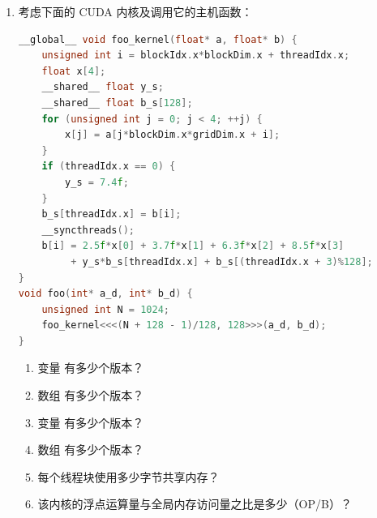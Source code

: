 \begin{enumerate}[label=\arabic*.,leftmargin=2.7em]
\begin{lstlisting}[language=C++,firstnumber=1]
dim3 blockDim(BLOCK_WIDTH, BLOCK_WIDTH);
dim3 gridDim(A_width/blockDim.x, A_height/blockDim.y);
BlockTranspose<<<gridDim, blockDim>>>(A, A_width, A_height);
__global__ void
BlockTranspose(float* A_elements, int A_width, int A_height)
{
    __shared__ float blockA[BLOCK_WIDTH][BLOCK_WIDTH];
    int baseIdx = blockIdx.x * BLOCK_SIZE + threadIdx.x;
    baseIdx += (blockIdx.y * BLOCK_SIZE + threadIdx.y) * A_width;
    blockA[threadIdx.y][threadIdx.x] = A_elements[baseIdx];
    A_elements[baseIdx] = blockA[threadIdx.x][threadIdx.y];
}
\end{lstlisting}

  \begin{enumerate}[label=\alph*.,leftmargin=2.2em]
    \item 在  的可能取值范围内，哪些值能让该内核在设备上
    正确执行？
    \item 如果不是所有值都能正确执行，错误执行行为的根本原因是什么？如何
    修改代码，使其对所有  值都能工作？
  \end{enumerate}

  \noindent\textbf{译者注：}\\
  底本的声明使用 。
  索引表达式和小题文字则使用 。\par
  这是底本内部命名不一致。本译稿保留这一差异。\par
  正确实现应统一使用同一个宏名。

  \item 考虑下面的 CUDA 内核及调用它的主机函数：

\begin{lstlisting}[language=C++,firstnumber=1]
__global__ void foo_kernel(float* a, float* b) {
    unsigned int i = blockIdx.x*blockDim.x + threadIdx.x;
    float x[4];
    __shared__ float y_s;
    __shared__ float b_s[128];
    for (unsigned int j = 0; j < 4; ++j) {
        x[j] = a[j*blockDim.x*gridDim.x + i];
    }
    if (threadIdx.x == 0) {
        y_s = 7.4f;
    }
    b_s[threadIdx.x] = b[i];
    __syncthreads();
    b[i] = 2.5f*x[0] + 3.7f*x[1] + 6.3f*x[2] + 8.5f*x[3]
         + y_s*b_s[threadIdx.x] + b_s[(threadIdx.x + 3)%128];
}
void foo(int* a_d, int* b_d) {
    unsigned int N = 1024;
    foo_kernel<<<(N + 128 - 1)/128, 128>>>(a_d, b_d);
}
\end{lstlisting}

  \begin{enumerate}[label=\alph*.,leftmargin=2.2em]
    \item 变量  有多少个版本？
    \item 数组  有多少个版本？
    \item 变量  有多少个版本？
    \item 数组  有多少个版本？
    \item 每个线程块使用多少字节共享内存？
    \item 该内核的浮点运算量与全局内存访问量之比是多少（OP/B）？
  \end{enumerate}


\end{enumerate}
